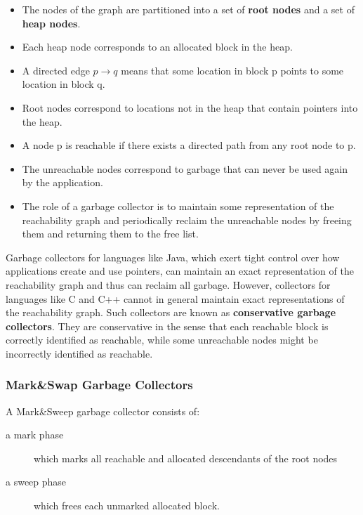 \documentclass[11pt]{article}
\begin{document}
\begin{itemize}
\item The nodes of the graph are partitioned into a set of \textbf{root nodes} and a set of \textbf{heap nodes}.\\
\item Each heap node corresponds to an allocated block in the heap.\\
\item A directed edge \(p \rightarrow q\) means that some location in block p points to some location in block q.\\
\item Root nodes correspond to locations not in the heap that contain pointers into the heap.\\
\item A node p is reachable if there exists a directed path from any root node to p.\\
\item The unreachable nodes correspond to garbage that can never be used again by the application.\\
\item The role of a garbage collector is to maintain some representation of the reachability graph and periodically reclaim the unreachable nodes by freeing them and returning them to the free list.\\
\end{itemize}


Garbage collectors for languages like Java, which exert tight control over how applications create and use pointers, can maintain an exact representation of the reachability graph and thus can reclaim all garbage. However, collectors for languages like C and C++ cannot in general maintain exact representations of the reachability graph. Such collectors are known as \textbf{conservative garbage collectors}. They are conservative in the sense that each reachable block is correctly identified as reachable, while some unreachable nodes might be incorrectly identified as reachable.\\

\subsubsection{Mark\&Swap Garbage Collectors}
\label{sec:orgd7019cc}
A Mark\&Sweep garbage collector consists of:\\
\begin{description}
\item[{a mark phase}] which marks all reachable and allocated descendants of the root nodes\\
\item[{a sweep phase}] which frees each unmarked allocated block.\\
\end{description}
\end{document}
